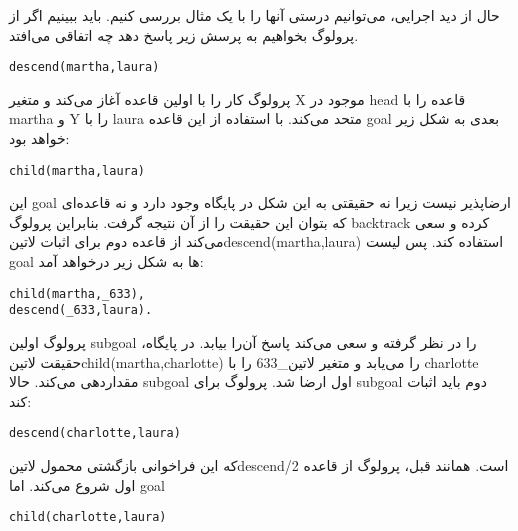حال از دید اجرایی، می‌توانیم درستی آنها را با یک مثال بررسی کنیم. باید ببینیم اگر از پرولوگ بخواهیم به پرسش زیر پاسخ دهد چه اتفاقی می‌افتد.

\begin{latin}
\begin{lstlisting}
descend(martha,laura)
\end{lstlisting}
\end{latin}

پرولوگ کار را با اولین قاعده آغاز می‌کند و متغیر X موجود در head قاعده را با martha و Y را با laura متحد می‌کند. با استفاده از این قاعده goal بعدی به شکل زیر خواهد بود:

\begin{latin}
\begin{lstlisting}
child(martha,laura)
\end{lstlisting}
\end{latin}

این goal ارضاپذیر نیست زیرا نه حقیقتی به این شکل در پایگاه وجود دارد و نه قاعده‌ای که بتوان این حقیقت را از آن نتیجه گرفت. بنابراین پرولوگ backtrack کرده و سعی می‌کند از قاعده دوم برای اثبات ‌لاتین{descend(martha,laura)} استفاده کند. پس لیست goal ها به شکل زیر درخواهد آمد:

\begin{latin}
\begin{lstlisting}
child(martha,_633),
descend(_633,laura).
\end{lstlisting}
\end{latin}

پرولوگ اولین subgoal را در نظر گرفته و سعی می‌کند پاسخ آن‌را بیابد. در پایگاه، حقیقت ‌لاتین{child(martha,charlotte)} را می‌یابد و متغیر ‌لاتین{\_633} را با charlotte مقداردهی می‌کند. حالا subgoal اول ارضا شد. پرولوگ برای subgoal دوم باید اثبات کند:

\begin{latin}
\begin{lstlisting}
descend(charlotte,laura)
\end{lstlisting}
\end{latin}

که این فراخوانی بازگشتی محمول ‌لاتین{descend/2} است. همانند قبل، پرولوگ از قاعده اول شروع می‌کند. اما goal

\begin{latin}
\begin{lstlisting}
child(charlotte,laura)
\end{lstlisting}
\end{latin}

